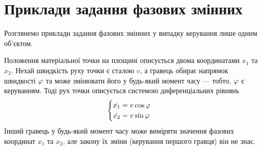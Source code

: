 \section{Приклади задання фазових змінних}
Розглянемо приклади задання фазових змінних у випадку керування лише одним об'єктом.
\begin{example}
    Положення матеріальної точки на площині описується двома координатами $x_1$ та $x_2$. 
    Нехай швидкість руху точки є сталою $v$, а гравець обирає напрямок швидкості $\varphi$ та може змінювати його у будь-який момент часу --- тобто, $\varphi$
    є керуванням. Тоді рух точки описується системою диференціальних рівнянь
    \begin{gather*}
        \begin{cases}
            \dot{x_1} = v \cos \varphi \\
            \dot{x_2} = v \sin \varphi
        \end{cases}
    \end{gather*}
    Інший гравець у будь-який момент часу може виміряти значення фазових координат $x_1$ та $x_2$, але закону їх зміни (керування першого гравця) він не знає.
\end{example}
